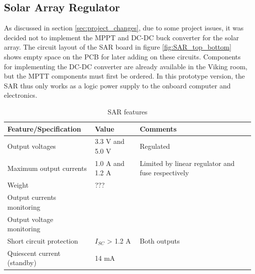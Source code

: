 \subsection{Solar Array Regulator}
%
%
As discussed in section \ref{sec:project_changes}, due to some project issues, it was decided not to implement the \ac{MPPT} and DC-DC buck converter for the solar array. The circuit layout of the \ac{SAR} board in  figure \ref{fig:SAR_top_bottom} shows empty space on the \ac{PCB} for later adding on these circuits. Components for implementing the DC-DC converter are already available in the Viking room, but the \ac{MPTT} components must first be ordered.
%
%
In this prototype version, the \ac{SAR} thus only works as a logic power supply to the onboard computer and electronics.
%
%
\begin{table}[H]
\centering
\caption{\ac{SAR} features}
\label{tab:BCR_features}
\begin{tabular}{p{}p{}p{}}
\hline
\textbf{Feature/Specification} & \textbf{Value} & \textbf{Comments}\\
\hline
Output voltages & 3.3 V and 5.0 V & Regulated \\
Maximum output currents & 1.0 A and 1.2 A & Limited by linear regulator and fuse respectively \\
Weight & ??? & \\
Output currents monitoring & & \\
Output voltage monitoring & & \\
Short circuit protection & $I_{SC}$ > 1.2 A & Both outputs \\
Quiescent current (standby) & 14 mA & \\
\hline
\end{tabular}
\end{table} 
%
%
